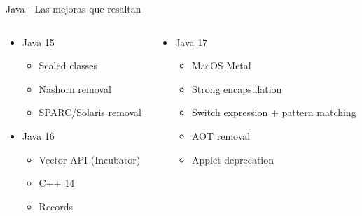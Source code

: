 \documentclass[aspectratio=169]{beamer}
\begin{document}
\begin{frame}[fragile]{Java - Las mejoras que resaltan}
	\begin{columns}[T] %
		
		\begin{column}[T]{5cm} %
			\begin{itemize}
				\item Java 15
				\begin{itemize}
					\item Sealed classes
					\item Nashorn removal
                    \item SPARC/Solaris removal
				\end{itemize}
				\item Java 16
				\begin{itemize}
					\item Vector API (Incubator)
					\item C++ 14
					\item Records
				\end{itemize}
                
			\end{itemize}
		\end{column}
		\begin{column}[T]{5cm} %
			\begin{itemize}
                \item Java 17
                               \begin{itemize}
                                   \item MacOS Metal
                                   \item Strong encapsulation
                                   \item Switch expression + pattern matching
                                   \item AOT removal
                                                                  \item Applet deprecation
                               \end{itemize}
			\end{itemize}
		\end{column}
	\end{columns}
\end{frame}
\end{document}
